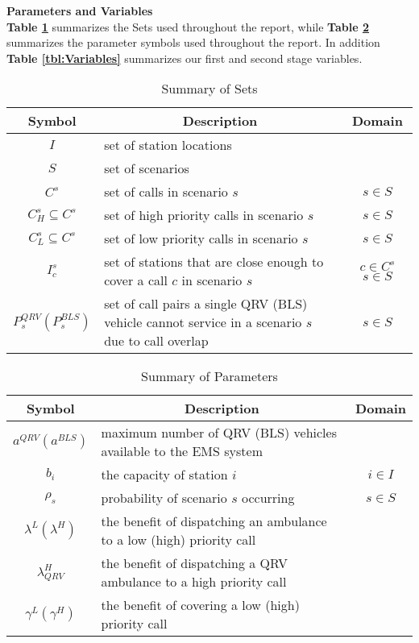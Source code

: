 \documentclass[12pt]{report}
\begin{document}
\pagebreak{}
\noindent\textbf{Parameters and Variables}\\
\indent\textbf{Table \ref{tbl:Sets}} summarizes the Sets used
throughout the report, while \textbf{Table \ref{tbl:Parameters}} summarizes the parameter symbols used throughout the report. In addition \textbf{Table \ref{tbl:Variables}} summarizes our first and second stage variables. 
\begin{table}[h]
\centering
\caption{Summary of Sets\label{tbl:Sets}}
{\begin{tabular}{c p{4in} c} \hline
Symbol & \multicolumn{1}{c}{Description} & Domain \\
\hline
$I$ & set of station locations \\
$S$ & set of scenarios \\
$C^s$ & set of calls in scenario $s$ & $s \in S$ \\
$C^s_H\subseteq C^s$ & set of high priority calls in scenario $s$ & $s \in S$ \\
$C^s_L \subseteq C^s$ & set of low priority calls in scenario $s$ & $s \in S$ \\
$I^s_c$ & set of stations that are close enough to cover a call $c$ in scenario $s$ &  $c\in C^s$ $s \in S$ \\
$P^{QRV}_{s}(P^{BLS}_{s})$ & set of call pairs a single QRV (BLS) vehicle cannot service in a scenario $s$ due to call overlap & $s \in S$ 
\\
\hline
\end{tabular}}
\end{table}
\begin{table}[h]
\centering
\caption{Summary of Parameters\label{tbl:Parameters}}
{\begin{tabular}{c p{4in} c} \hline
Symbol & \multicolumn{1}{c}{Description} & Domain \\
\hline
 $a^{QRV} (a^{BLS})$ & maximum number of QRV (BLS) vehicles available to the EMS system \\
 $b_i$ & the capacity of station $i$ & $i \in I$\\
$\rho_s$ & probability of scenario $s$ occurring & $s \in S$\\
 $\lambda^L (\lambda^H)$ & the benefit of dispatching an ambulance to a low (high) priority call\\
 $\lambda^H_{QRV}$ & the benefit of dispatching a QRV ambulance to a high priority call\\
 $\gamma^L (\gamma^H)$ & the benefit of covering a low (high) priority call\\
\hline
\end{tabular}}
\end{table}
\end{document}
